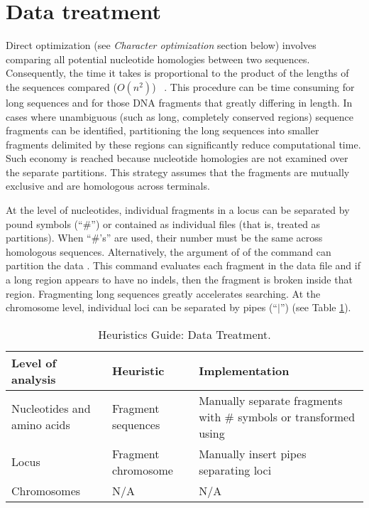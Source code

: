 \section{Data treatment}

Direct optimization (see \emph{Character optimization} section below) involves comparing all potential nucleotide 
homologies between two sequences. Consequently, the time it takes is proportional to the product of the lengths of 
the sequences compared ($O(n^2)$) ~\cite{wheeler2012book}. This procedure can be time consuming for long sequences and for those DNA 
fragments that greatly differing in length. In cases where unambiguous (such as long, completely conserved regions) 
sequence fragments can be identified, partitioning the long sequences into smaller fragments delimited by these regions 
can significantly reduce computational time. Such economy is reached because nucleotide homologies are not examined 
over the separate partitions. This strategy assumes that the fragments are mutually exclusive and are  
homologous across terminals.

At the level of nucleotides, individual fragments in a locus can be separated by pound symbols (``\#'') or contained 
as individual files (that is, treated as partitions). When ``\#'s'' are used, their number must be the same across homologous 
sequences. Alternatively, the argument of  of the command  can partition
the data . This command evaluates each fragment in the data file and if a long region appears to have no indels, then the 
fragment is broken inside that region. Fragmenting long sequences greatly accelerates searching. 
At the chromosome level, individual loci can be separated by pipes (``$\vert$'') (see Table \ref{HeuristicsGuide1}).

\begin{table}[t] 
\small
\caption{Heuristics Guide: Data Treatment.}
\label{HeuristicsGuide1} 
\begin{center}
\renewcommand{\arraystretch}{1.5}
\begin{tabular}{p{2.5cm}  p{3.4cm}  p{5.4cm} } 
\hline
	Level of analysis & Heuristic & Implementation \\
\hline
	Nucleotides and amino acids  & Fragment sequences & Manually separate fragments with \# symbols or transformed using
	\poycommand{auto\_sequence\_partition}\\
	Locus & Fragment chromosome & Manually insert pipes separating loci \\
	Chromosomes & N/A & N/A \\
\hline
\end{tabular}
\end{center}
\end{table}


